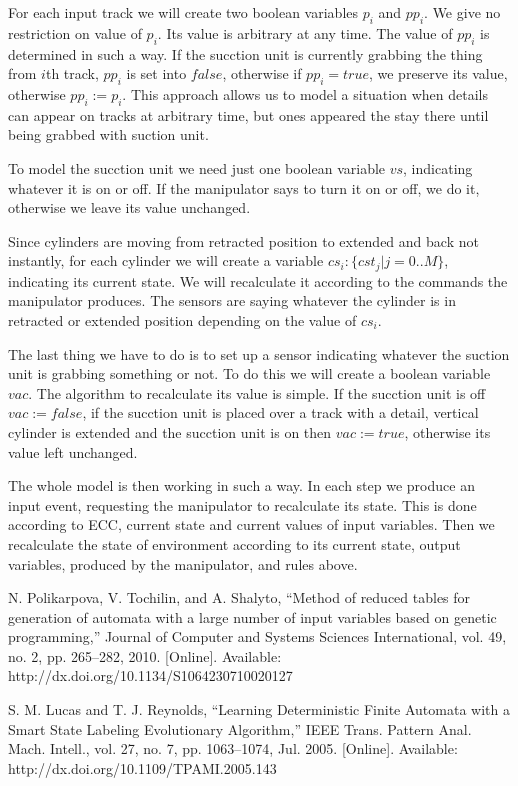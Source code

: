 \documentclass[fleqn,twocolumn]{article}
\begin{document}
For each input track we will create two boolean variables $p_i$ and $pp_i$. We give no restriction on value of $p_i$. Its value is arbitrary at any time.
The value of $pp_i$ is determined in such a way. If the sucction unit is currently grabbing the thing from $i$th track, $pp_i$ is set into $false$, otherwise
if $pp_i = true$, we preserve its value, otherwise $pp_i := p_i$. This approach allows us to model a situation when details can appear on tracks at arbitrary
time, but ones appeared the stay there until being grabbed with suction unit.

To model the sucction unit we need just one boolean variable $vs$, indicating whatever it is on or off. If the manipulator says to turn it on or off, we do it,
otherwise we leave its value unchanged.

Since cylinders are moving from retracted position to extended and back not instantly, for each cylinder we will create a variable $cs_i : \{ cst_j | j = 0 .. M \}$,
indicating its current state. We will recalculate it according to the commands the manipulator produces. The sensors are saying whatever the cylinder is in
retracted or extended position depending on the value of $cs_i$.

The last thing we have to do is to set up a sensor indicating whatever the suction unit is grabbing something or not. To do this we will create a boolean
variable $vac$. The algorithm to recalculate its value is simple. If the sucction unit is off $vac := false$, if the sucction unit is placed over a
track with a detail, vertical cylinder is extended and the sucction unit is on then $vac := true$, otherwise its value left unchanged.

The whole model is then working in such a way. In each step we produce an input event, requesting the manipulator to recalculate its state. This is done
according to ECC, current state and current values of input variables. Then we recalculate the state of environment according to its current state,
output variables, produced by the manipulator, and rules above.

\begin{thebibliography}{2}

N. Polikarpova, V. Tochilin, and A. Shalyto, “Method of reduced tables for generation of automata with a large number of input variables
based on genetic programming,” Journal of Computer and Systems Sciences International, vol. 49, no. 2, pp. 265–282, 2010. [Online].
Available: http://dx.doi.org/10.1134/S1064230710020127

S. M. Lucas and T. J. Reynolds, “Learning Deterministic Finite Automata with a Smart State Labeling Evolutionary Algorithm,” IEEE
Trans. Pattern Anal. Mach. Intell., vol. 27, no. 7, pp. 1063–1074, Jul. 2005. [Online]. Available: http://dx.doi.org/10.1109/TPAMI.2005.143

\end{thebibliography}
\end{document}
